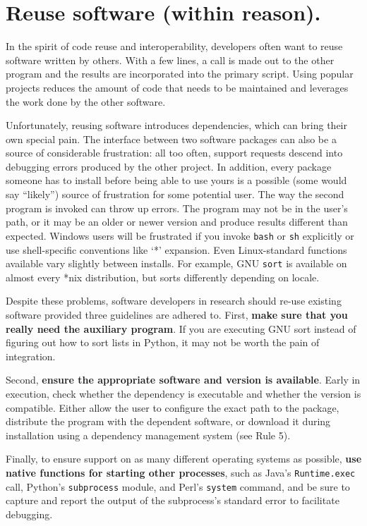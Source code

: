 \documentclass[10pt,letterpaper]{article}
\begin{document}
\section{Reuse software (within reason).}

In the spirit of code reuse and interoperability, developers often want
to reuse software written by others. 
With a few lines, a call
is made out to the other program and the results are incorporated into the
primary script. Using popular projects reduces the amount of code that
needs to be maintained and leverages the work done by the other software.

Unfortunately, reusing software introduces dependencies, which can
bring their own special pain.  The interface between two software
packages can also be a source of considerable frustration: all too
often, support requests descend into debugging errors produced by the
other project. 
In addition, every package someone has to install
before being able to use yours is a
possible (some would say ``likely'') source of frustration for some
potential user. The way the second program is invoked can throw up errors.
The program may not be in the user's path, or it may be an
older or newer version and produce results different than expected.
Windows users will be frustrated if you invoke \texttt{bash} or \texttt{sh} explicitly or
use shell-specific conventions like `*' expansion.
Even Linux-standard functions available vary slightly between
installs. For example, GNU \texttt{sort} is available on almost every
*nix distribution, but sorts differently depending on locale.

Despite these problems, software developers in research should
re-use existing software provided three guidelines are adhered to.
First, 
\textbf{make sure that you really need the auxiliary program}. If you are
executing GNU sort instead of figuring out how to sort lists in Python,
it may not be worth the pain of integration.

Second, \textbf{ensure the appropriate software and version is available}.
Early in execution, check whether the dependency is executable and whether the
version is compatible.
Either allow the user to
configure the exact path to the package, distribute the program with the
dependent software, or download it during installation using a
dependency management system (see Rule 5). 

Finally, to ensure support on as many different operating systems as
possible, \textbf{use native functions for starting other processes}, such as
Java's \texttt{Runtime.exec} call, Python's \texttt{subprocess} module, and Perl's \texttt{system}
command, and be sure to capture and report the output of the subprocess's standard error
to facilitate debugging.
\end{document}
